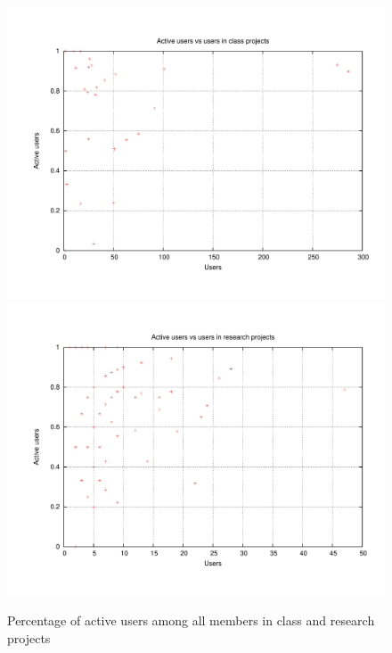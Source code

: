\documentclass[10pt]{article}
\begin{document}
\begin{figure}[htbp]
\begin{center}
\includegraphics[width=5in]{figs/clprojauser.pdf}
\includegraphics[width=5in]{figs/resprojauser.pdf}
\caption{Percentage of active users among all members in class and research projects}
\label{projauser}
\end{center}
\end{figure}
\end{document}
